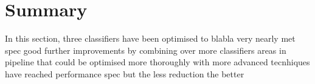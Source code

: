 \section{Summary}
\label{sec:exp-summary}
    In this section, three classifiers have been optimised to blabla
    very nearly met spec
    good
    further improvements by combining over more classifiers
    areas in pipeline that could be optimised more thoroughly with more advanced tecnhiques
    have reached performance spec but the less reduction the better